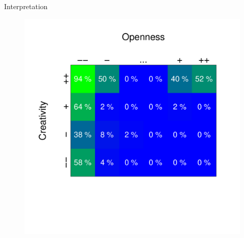\documentclass[12pt, notes=show]{beamer}
\begin{document}
\begin{frame}{Interpretation}
    \begin{figure}
	\includegraphics[width=.65\textwidth]{images/heatmapSimuProba.pdf}\\
	\centering
    \end{figure}

\end{frame}


%
%
\end{document}
